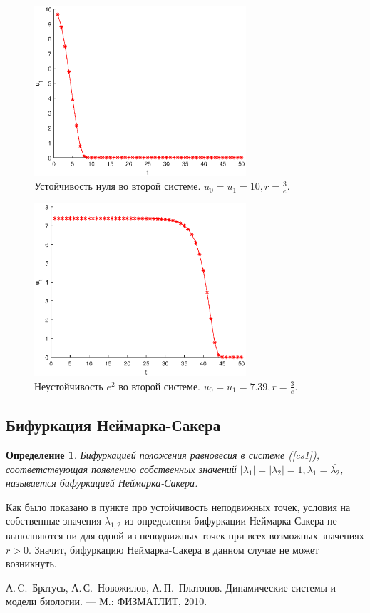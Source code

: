 \documentclass[12pt]{article}
\newtheorem{definition}{Определение}
\begin{document}
\begin{figure}[H]
    \begin{center}
    \includegraphics[width=0.7\textwidth]{stability2.eps}
    \caption{Устойчивость нуля во второй системе. $u_0 = u_1 = 10, r = \frac{3}{e}$.}
    \label{pic9}
    \end{center}
\end{figure}

\begin{figure}[H]
    \begin{center}
    \includegraphics[width=0.7\textwidth]{stability3.eps}
    \caption{Неустойчивость $e^2$ во второй системе. $u_0 = u_1 = 7.39, r = \frac{3}{e}$.}
    \label{pic10}
    \end{center}
\end{figure}

\newpage
\subsection{Бифуркация Неймарка-Сакера}
\begin{definition}
    Бифуркацией положения равновесия в системе (\ref{cs1}), соответствующая появлению собственных значений $|\lambda_1| = |\lambda_2| = 1, \lambda_1 = \bar{\lambda_2}$, называется бифуркацией Неймарка-Сакера.
\end{definition}
Как было показано в пункте про устойчивость неподвижных точек, условия на собственные значения $\lambda_{1,2}$ из определения бифуркации Неймарка-Сакера не выполняются ни для одной из неподвижных точек при всех возможных значениях $r > 0$. Значит, бифуркацию Неймарка-Сакера в данном случае не может возникнуть.

\newpage
\begin{thebibliography}{9}
    \bibitem[1]{} А.\,C.~Братусь, А.\,С.~Новожилов, А.\,П.~Платонов. Динамические системы и модели биологии. — М.: ФИЗМАТЛИТ, 2010.
\end{thebibliography}
\end{document}
